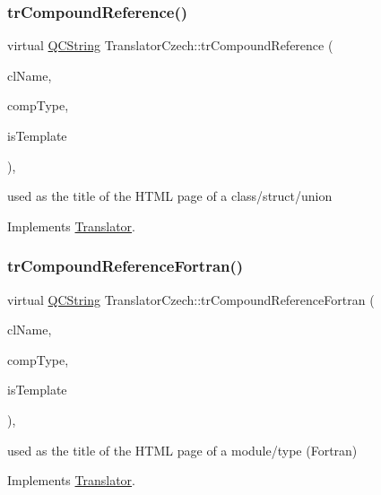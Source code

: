 \subsubsection{\texorpdfstring{trCompoundReference()}{trCompoundReference()}}
{\footnotesize\ttfamily virtual \mbox{\hyperlink{class_q_c_string}{Q\+C\+String}} Translator\+Czech\+::tr\+Compound\+Reference (\begin{DoxyParamCaption}\item[{const char $\ast$}]{cl\+Name,  }\item[{\mbox{\hyperlink{class_class_def_ae70cf86d35fe954a94c566fbcfc87939}{Class\+Def\+::\+Compound\+Type}}}]{comp\+Type,  }\item[{bool}]{is\+Template }\end{DoxyParamCaption})\hspace{0.3cm}{\ttfamily [inline]}, {\ttfamily [virtual]}}

used as the title of the H\+T\+ML page of a class/struct/union 

Implements \mbox{\hyperlink{class_translator}{Translator}}.

\mbox{\label{class_translator_czech_a0fa9bdec49d36a1ae5396209494740e8}} 
\subsubsection{\texorpdfstring{trCompoundReferenceFortran()}{trCompoundReferenceFortran()}}
{\footnotesize\ttfamily virtual \mbox{\hyperlink{class_q_c_string}{Q\+C\+String}} Translator\+Czech\+::tr\+Compound\+Reference\+Fortran (\begin{DoxyParamCaption}\item[{const char $\ast$}]{cl\+Name,  }\item[{\mbox{\hyperlink{class_class_def_ae70cf86d35fe954a94c566fbcfc87939}{Class\+Def\+::\+Compound\+Type}}}]{comp\+Type,  }\item[{bool}]{is\+Template }\end{DoxyParamCaption})\hspace{0.3cm}{\ttfamily [inline]}, {\ttfamily [virtual]}}

used as the title of the H\+T\+ML page of a module/type (Fortran) 

Implements \mbox{\hyperlink{class_translator}{Translator}}.

